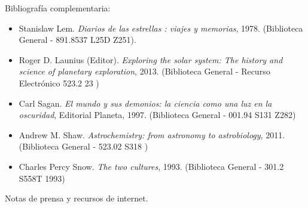 \documentclass[letterpaper,10pt,onecolumn]{article}
\begin{document}
\noindent\normalsize Bibliograf\'ia complementaria:


\begin{itemize}
\item Stanislaw Lem. \textit{Diarios de las estrellas : viajes y
  memorias}, 1978. (Biblioteca General - 891.8537 L25D Z251). \\[-0.6cm]
\item Roger D. Launius (Editor). \textit{Exploring the solar system:
  The history and science of planetary exploration},
  2013. (Biblioteca General - Recurso Electr\'onico 523.2 23 )\\[-0.6cm]
\item Carl Sagan. \textit{El mundo y sus demonios: la ciencia
  como una luz en la oscuridad}, Editorial Planeta,
  1997. (Biblioteca General - 001.94 S131 Z282) \\[-0.6cm]
\item Andrew M. Shaw. \textit{Astrochemistry: from astronomy to astrobiology}, 2011. (Biblioteca General -  523.02 S318 )\\[-0.6cm]
\item Charles Percy Snow. \textit{The two cultures},
  1993. (Biblioteca General - 301.2 S558T 1993)\\[-0.6cm]
\end{itemize}

\noindent
Notas de prensa y recursos de internet.
\end{document}
